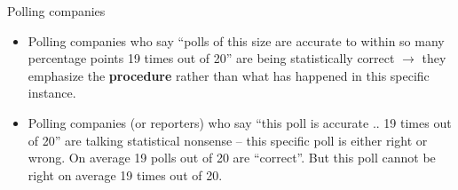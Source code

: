 \documentclass{beamer}\usepackage[]{graphicx}\usepackage[]{color}
\begin{document}
\begin{frame}{Polling companies}
\begin{itemize}
					\setlength\itemsep{2em}
	\item Polling companies who say ``polls of this size are accurate to within so many percentage points 19 times out of 20'' are being statistically correct $\to$ they emphasize the \textbf{procedure} rather than what has happened in this specific instance. \pause 
	\item Polling companies (or reporters) who say ``this poll is accurate .. 19
	times out of 20'' are talking statistical nonsense -- this specific poll is either right or wrong. On average 19 polls out of 20 are ``correct''. But this
	poll cannot be right on average 19 times out of 20.
\end{itemize}
\end{frame}

\end{document}
